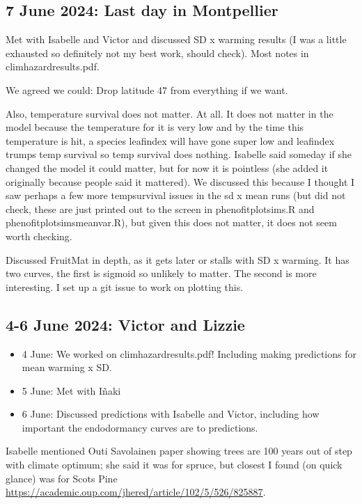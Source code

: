 \documentclass[11pt,letter]{article}
\begin{document}
\subsection{7 June 2024: Last day in Montpellier}
Met with Isabelle and Victor and discussed SD x warming results (I was a little exhausted so definitely not my best work, should check). Most notes in climhazardresults.pdf. 

We agreed we could: Drop latitude 47 from everything if we want. 

Also, temperature survival does not matter. At all. It does not matter in the model because the temperature for it is very low and by the time this temperature is hit, a species leafindex will have gone super low and leafindex trumps temp survival so temp survival does nothing. Isabelle said someday if she changed the model it could matter, but for now it is pointless (she added it originally because people said it mattered). We discussed this because I thought I saw perhaps a few more tempsurvival issues in the sd x mean runs (but did not check, these are just printed out to the screen in phenofitplotsims.R and phenofitplotsimsmeanvar.R), but given this does not matter, it does not seem worth checking.

Discussed FruitMat in depth, as it gets later or stalls with SD x warming. It has two curves, the first is sigmoid so unlikely to matter. The second is more interesting. I set up a git issue to work on plotting this. 

\subsection{4-6 June 2024: Victor and Lizzie}

\begin{itemize}
\item 4 June: We worked on climhazardresults.pdf! Including making predictions for mean warming x SD. \\
\item 5 June: Met with I\~naki \\
\item 6 June: Discussed predictions with Isabelle and Victor, including how important the endodormancy curves are to predictions. 
\end{itemize}

Isabelle mentioned Outi Savolainen paper showing trees are 100 years out of step with climate optimum; she said it was for spruce, but closest I found (on quick glance) was for Scots Pine \url{https://academic.oup.com/jhered/article/102/5/526/825887}.
\end{document}
